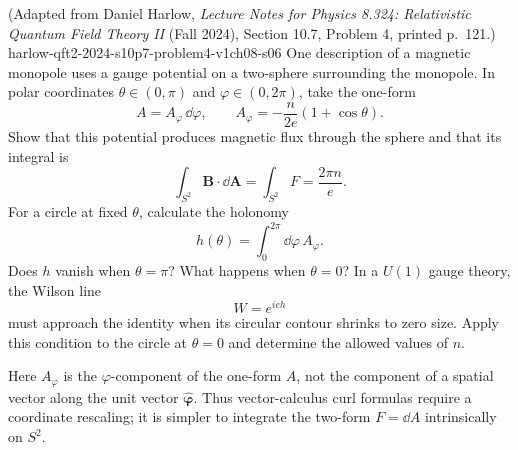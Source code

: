 \begin{enumerate}
  {(Adapted from Daniel Harlow, \emph{Lecture Notes for Physics 8.324: Relativistic Quantum Field Theory II} (Fall 2024), Section 10.7, Problem 4, printed p.~121.)}
  {harlow-qft2-2024-s10p7-problem4-v1ch08-s06}
One description of a magnetic monopole uses a gauge potential on a
two-sphere surrounding the monopole.  In polar coordinates
\(\theta\in(0,\pi)\) and \(\varphi\in(0,2\pi)\), take the one-form
\[
 A=A_\varphi\,\dd\varphi,
 \qquad
 A_\varphi=-\frac{n}{2e}(1+\cos\theta).
\]
Show that this potential produces magnetic flux through the sphere and
that its integral is
\[
 \int_{S^2}\mathbf B\cdot \dd\mathbf A
 =\int_{S^2}F=\frac{2\pi n}{e}.
\]
For a circle at fixed \(\theta\), calculate the holonomy
\[
 h(\theta)=\int_0^{2\pi}\dd\varphi\,A_\varphi.
\]
Does \(h\) vanish when \(\theta=\pi\)?  What happens when
\(\theta=0\)?  In a \(U(1)\) gauge theory, the Wilson line
\[
 W=e^{ieh}
\]
must approach the identity when its circular contour shrinks to zero
size.  Apply this condition to the circle at \(\theta=0\) and determine
the allowed values of \(n\).

Here \(A_\varphi\) is the \(\varphi\)-component of the one-form \(A\), not
the component of a spatial vector along the unit vector
\(\widehat{\boldsymbol\varphi}\).  Thus vector-calculus curl formulas
require a coordinate rescaling; it is simpler to integrate the two-form
\(F=\dd A\) intrinsically on \(S^2\).


\end{enumerate}
